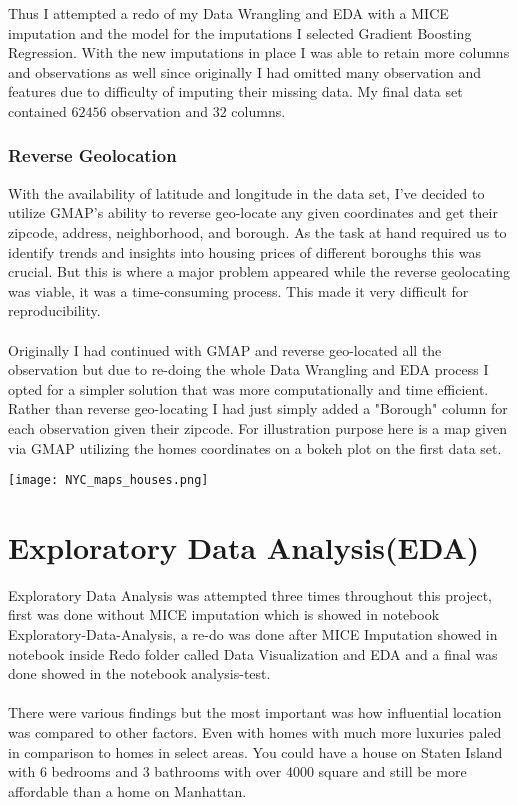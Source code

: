 \documentclass{article}
\begin{document}
\begin{titlepage}
    Thus I attempted a redo of my Data Wrangling and EDA with a MICE imputation and the model for the imputations I selected Gradient Boosting Regression. With the new imputations in place I was able to retain more columns and observations as well since originally I had omitted many observation and features due to difficulty of imputing their missing data. My final data set contained $62456$ observation and $32$ columns.
\subsubsection{Reverse Geolocation}
    With the availability of latitude and longitude in the data set, I've decided to utilize GMAP's ability to reverse geo-locate any given coordinates and get their zipcode, address, neighborhood, and borough. As the task at hand required us to identify trends and insights into housing prices of different boroughs this was crucial. But this is where a major problem appeared while the reverse geolocating was viable, it was a time-consuming process. This made it very difficult for reproducibility. \\
    \\
    Originally I had continued with GMAP and reverse geo-located all the observation but due to re-doing the whole Data Wrangling and EDA process I opted for a simpler solution that was more computationally and time efficient. Rather than reverse geo-locating I had just simply added a "Borough" column for each observation given their zipcode. For illustration purpose here is a map given via GMAP utilizing the homes coordinates on a bokeh plot on the first data set. \\
    \begin{center}
        \texttt{[image: NYC\_maps\_houses.png]}
    \end{center}
    
    
\section{Exploratory Data Analysis(EDA)}

Exploratory Data Analysis was attempted three times throughout this project, first was done without MICE imputation which is showed in notebook Exploratory-Data-Analysis, a re-do  was done after MICE Imputation showed in notebook inside Redo folder called Data Visualization and EDA and a final was done showed in the notebook analysis-test.\\
\\
There were various findings but the most important was how influential location was compared to other factors. Even with homes with much more luxuries paled in comparison to homes in select areas. You could have a house on Staten Island with 6 bedrooms and 3 bathrooms with over 4000 square and still be more affordable than a home on Manhattan. \\

\end{titlepage}
\end{document}
